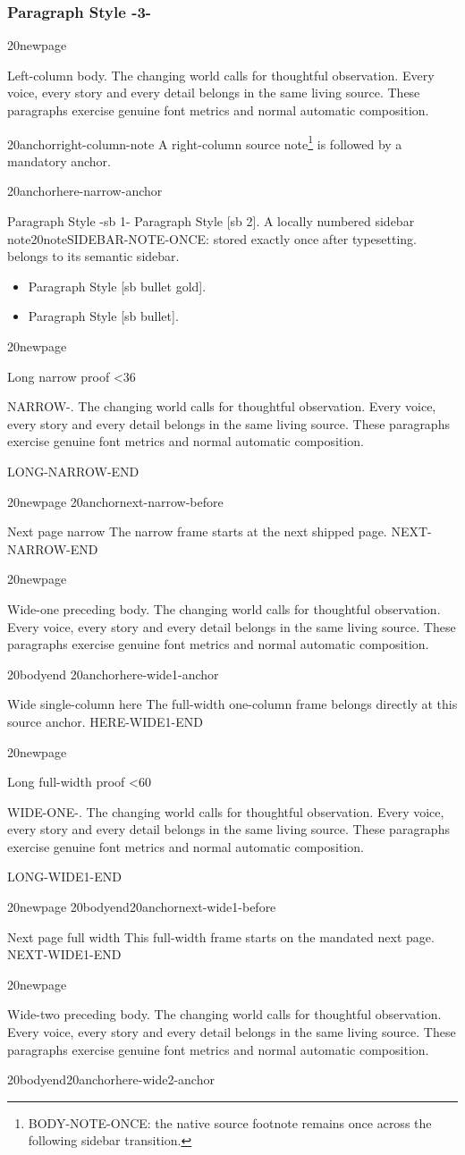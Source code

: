\documentclass{m20book}
\newcommand\ProofPara[1]{\par\noindent #1. The changing world calls for thoughtful observation. Every voice, every story and every detail belongs in the same living source. These paragraphs exercise genuine font metrics and normal automatic composition.\par}
\newcommand\ProofLong[2]{\newcount\proofcount\proofcount=0\loop\ifnum\proofcount<#1\advance\proofcount1\ProofPara{#2-\number\proofcount}\repeat}
\begin{document}
\subsubsection{Paragraph Style -3-}
\m20newpage
\ProofPara{Left-column body}
\columnbreak
\m20anchor{right-column-note}
A right-column source note\footnote{BODY-NOTE-ONCE: the native source footnote remains once across the following sidebar transition.} is followed by a mandatory anchor.\par
\m20anchor{here-narrow-anchor}
\begin{m20sidebar}[id=here-narrow,place=here]{Paragraph Style -sb 1-}
Paragraph Style [sb 2].\label{proof:once} A locally numbered sidebar note\m20note{SIDEBAR-NOTE-ONCE: stored exactly once after typesetting.} belongs to its semantic sidebar.
\begin{itemize}\item Paragraph Style [sb bullet gold].\item Paragraph Style [sb bullet].\end{itemize}
\end{m20sidebar}
\m20newpage
\begin{m20sidebar}[id=long-narrow,place=flow]{Long narrow proof}
\ProofLong{36}{NARROW} LONG-NARROW-END
\end{m20sidebar}
\m20newpage
\m20anchor{next-narrow-before}
\begin{m20sidebar}[id=next-narrow,place=next-page]{Next page narrow}
The narrow frame starts at the next shipped page. NEXT-NARROW-END
\end{m20sidebar}
\m20newpage
\ProofPara{Wide-one preceding body}
\m20bodyend
\m20anchor{here-wide1-anchor}
\begin{m20sidebarwide}[id=here-wide1,columns=1,place=here]{Wide single-column here}
The full-width one-column frame belongs directly at this source anchor. HERE-WIDE1-END
\end{m20sidebarwide}
\m20newpage
\begin{m20sidebarwide}[id=long-wide1,columns=1,place=flow]{Long full-width proof}
\ProofLong{60}{WIDE-ONE} LONG-WIDE1-END
\end{m20sidebarwide}
\m20newpage
\m20bodyend\m20anchor{next-wide1-before}
\begin{m20sidebarwide}[id=next-wide1,columns=1,place=next-page]{Next page full width}
This full-width frame starts on the mandated next page. NEXT-WIDE1-END
\end{m20sidebarwide}
\m20newpage
\ProofPara{Wide-two preceding body}
\m20bodyend\m20anchor{here-wide2-anchor}
\end{document}
